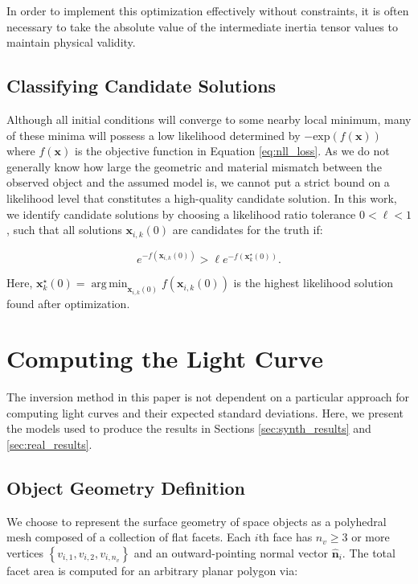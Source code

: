 \documentclass[a4paper,twocolumn]{spaceDebrisC} %
\newcommand{\vctr}[1]{\bm{#1}}
\newcommand{\unitv}[1]{\hat{\vctr{#1}}}
\DeclareMathOperator*{\argmin}{arg\,min}
\begin{document}
In order to implement this optimization effectively without constraints, it is often necessary to take the absolute value of the intermediate inertia tensor values to maintain physical validity. 

\subsection{Classifying Candidate Solutions} \label{sec:candidate_sols}

Although all initial conditions will converge to some nearby local minimum, many of these minima will possess a low likelihood determined by $-\mathrm{exp}(f(\vctr{x}))$ where $f(\vctr{x})$ is the objective function in Equation \ref{eq:nll_loss}. As we do not generally know how large the geometric and material mismatch between the observed object and the assumed model is, we cannot put a strict bound on a likelihood level that constitutes a high-quality candidate solution. In this work, we identify candidate solutions by choosing a likelihood ratio tolerance $0 < \ell < 1$, such that all solutions $\vctr{x}_{i,k}(0)$ are candidates for the truth if:

\begin{equation} \label{eq:ell_selection_criteria}
  e^{-f\left(\vctr{x}_{i,k}(0)\right)} > \ell e^{-f\left(\vctr{x}^\star_{k}(0)\right)}.
\end{equation}

Here, $\vctr{x}^\star_{k}(0) = \argmin_{\vctr{x}_{i,k}(0)} f\left(\vctr{x}_{i,k}(0)\right) $ is the highest likelihood solution found after optimization.

\section{Computing the Light Curve}

The inversion method in this paper is not dependent on a particular approach for computing light curves and their expected standard deviations. Here, we present the models used to produce the results in Sections \ref{sec:synth_results} and \ref{sec:real_results}.

\subsection{Object Geometry Definition}

We choose to represent the surface geometry of space objects as a polyhedral mesh composed of a collection of flat facets. Each $i$th face has $n_v \geq 3$ or more vertices $\left\{ v_{i,1}, v_{i,2}, v_{i,n_v} \right\}$ and an outward-pointing normal vector $\unitv{n}_i$. The total facet area is computed for an arbitrary planar polygon via:
\end{document}
